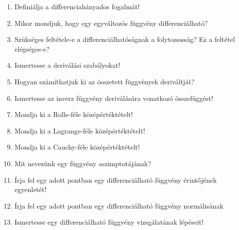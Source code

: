 \vfill
\begin{questions}[section.6.5]
  \begin{enumerate}
    \item Definiálja a differenciahányados fogalmát!
    \item Mikor mondjuk, hogy egy egyváltozós függvény differenciálható?
    \item Szükséges feltétele-e a differenciálhatóságnak a folytonosság? Ez a
          feltétel elég\-ség\-es-e?
    \item Ismertesse a deriválási szabályokat!
    \item Hogyan számíthatjuk ki az összetett függvények deriváltját?
    \item Ismertesse az inverz függvény deriválására vonatkozó összefüggést!
    \item Mondja ki a Rolle-féle középértéktételt!
    \item Mondja ki a Lagrange-féle középértéktételt!
    \item Mondja ki a Cauchy-féle középértéktételt!
    \item Mit nevezünk egy függvény aszimptotájának?
    \item Írja fel egy adott pontban egy differenciálható függvény érintőjének
          egyenletét!
    \item Írja fel egy adott pontban egy differenciálható függvény normálisának
    \item Ismertesse egy differenciálható függvény vizsgálatának lépéseit!
  \end{enumerate}
\end{questions}
